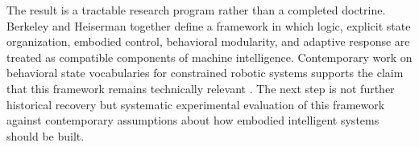 \documentclass[11pt]{article}
\begin{document}
The result is a tractable research program rather than a completed doctrine. Berkeley and
Heiserman together define a framework in which logic, explicit state organization, embodied
control, behavioral modularity, and adaptive response are treated as compatible components of
machine intelligence. Contemporary work on behavioral state vocabularies for constrained robotic
systems supports the claim that this framework remains technically relevant \citep{tucker2026behavioral}.
The next step is not further historical recovery but systematic experimental evaluation of this
framework against contemporary assumptions about how embodied intelligent systems should be
built.



\end{document}
